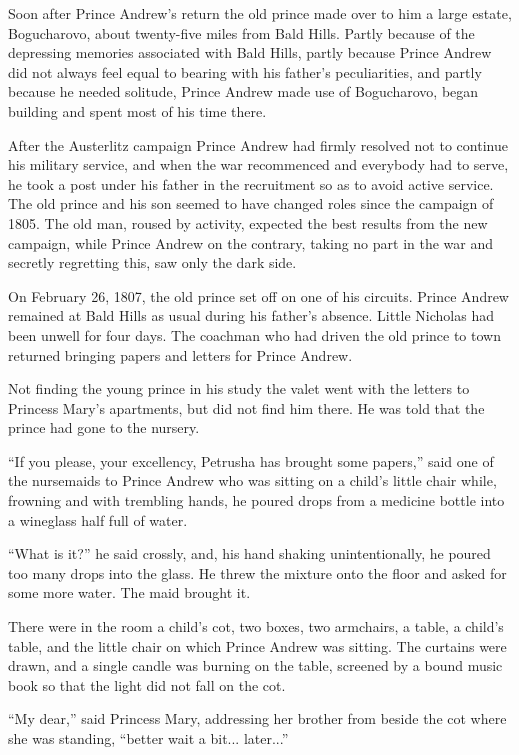 Soon after Prince Andrew's return the old prince made over to him
a large estate, Bogucharovo, about twenty-five miles from Bald
Hills.  Partly because of the depressing memories associated with
Bald Hills, partly because Prince Andrew did not always feel
equal to bearing with his father's peculiarities, and partly
because he needed solitude, Prince Andrew made use of
Bogucharovo, began building and spent most of his time there.

After the Austerlitz campaign Prince Andrew had firmly resolved
not to continue his military service, and when the war
recommenced and everybody had to serve, he took a post under his
father in the recruitment so as to avoid active service. The old
prince and his son seemed to have changed roles since the
campaign of 1805. The old man, roused by activity, expected the
best results from the new campaign, while Prince Andrew on the
contrary, taking no part in the war and secretly regretting this,
saw only the dark side.

On February 26, 1807, the old prince set off on one of his
circuits.  Prince Andrew remained at Bald Hills as usual during
his father's absence. Little Nicholas had been unwell for four
days. The coachman who had driven the old prince to town returned
bringing papers and letters for Prince Andrew.

Not finding the young prince in his study the valet went with the
letters to Princess Mary's apartments, but did not find him
there. He was told that the prince had gone to the nursery.

``If you please, your excellency, Petrusha has brought some
papers,'' said one of the nursemaids to Prince Andrew who was
sitting on a child's little chair while, frowning and with
trembling hands, he poured drops from a medicine bottle into a
wineglass half full of water.

``What is it?'' he said crossly, and, his hand shaking
unintentionally, he poured too many drops into the glass. He
threw the mixture onto the floor and asked for some more
water. The maid brought it.

There were in the room a child's cot, two boxes, two armchairs, a
table, a child's table, and the little chair on which Prince
Andrew was sitting. The curtains were drawn, and a single candle
was burning on the table, screened by a bound music book so that
the light did not fall on the cot.

``My dear,'' said Princess Mary, addressing her brother from
beside the cot where she was standing, ``better wait a
bit... later...''

